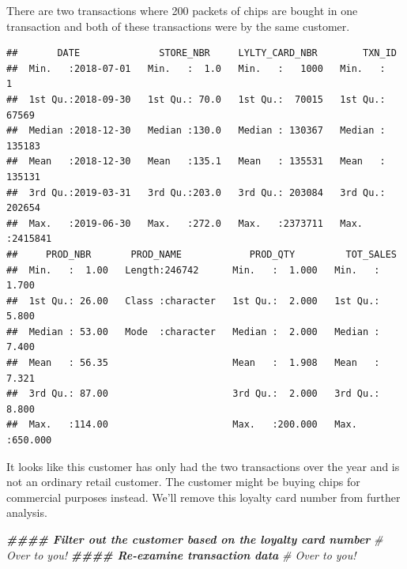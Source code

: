 \documentclass[
]{article}
\newenvironment{Shaded}{\begin{snugshade}}{\end{snugshade}}
\newcommand{\CommentTok}[1]{\textcolor[rgb]{0.56,0.35,0.01}{\textit{#1}}}
\newcommand{\DecValTok}[1]{\textcolor[rgb]{0.00,0.00,0.81}{#1}}
\newcommand{\DocumentationTok}[1]{\textcolor[rgb]{0.56,0.35,0.01}{\textbf{\textit{#1}}}}
\newcommand{\FunctionTok}[1]{\textcolor[rgb]{0.13,0.29,0.53}{\textbf{#1}}}
\newcommand{\NormalTok}[1]{#1}
\newcommand{\OtherTok}[1]{\textcolor[rgb]{0.56,0.35,0.01}{#1}}
\newcommand{\SpecialCharTok}[1]{\textcolor[rgb]{0.81,0.36,0.00}{\textbf{#1}}}
\begin{document}
There are two transactions where 200 packets of chips are bought in one
transaction and both of these transactions were by the same customer.

\begin{Shaded}
\end{Shaded}

\begin{verbatim}
##       DATE              STORE_NBR     LYLTY_CARD_NBR        TXN_ID       
##  Min.   :2018-07-01   Min.   :  1.0   Min.   :   1000   Min.   :      1  
##  1st Qu.:2018-09-30   1st Qu.: 70.0   1st Qu.:  70015   1st Qu.:  67569  
##  Median :2018-12-30   Median :130.0   Median : 130367   Median : 135183  
##  Mean   :2018-12-30   Mean   :135.1   Mean   : 135531   Mean   : 135131  
##  3rd Qu.:2019-03-31   3rd Qu.:203.0   3rd Qu.: 203084   3rd Qu.: 202654  
##  Max.   :2019-06-30   Max.   :272.0   Max.   :2373711   Max.   :2415841  
##     PROD_NBR       PROD_NAME            PROD_QTY         TOT_SALES      
##  Min.   :  1.00   Length:246742      Min.   :  1.000   Min.   :  1.700  
##  1st Qu.: 26.00   Class :character   1st Qu.:  2.000   1st Qu.:  5.800  
##  Median : 53.00   Mode  :character   Median :  2.000   Median :  7.400  
##  Mean   : 56.35                      Mean   :  1.908   Mean   :  7.321  
##  3rd Qu.: 87.00                      3rd Qu.:  2.000   3rd Qu.:  8.800  
##  Max.   :114.00                      Max.   :200.000   Max.   :650.000
\end{verbatim}

It looks like this customer has only had the two transactions over the
year and is not an ordinary retail customer. The customer might be
buying chips for commercial purposes instead. We'll remove this loyalty
card number from further analysis.

\begin{Shaded}
\begin{Highlighting}[]
\DocumentationTok{\#\#\#\# Filter out the customer based on the loyalty card number}
\CommentTok{\# Over to you!}
\DocumentationTok{\#\#\#\# Re{-}examine transaction data}
\CommentTok{\# Over to you!}
\end{Highlighting}
\end{Shaded}
\end{document}

